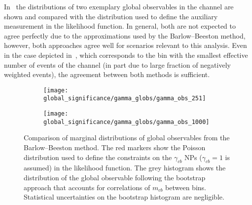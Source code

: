 In~ the distributions of two exemplary
global observables in the \hadhad channel are shown and compared with the
distribution used to define the auxiliary measurement in the likelihood
function. In general, both are not expected to agree perfectly due to the
approximations used by the Barlow--Beeston method, however, both approaches agree
well for scenarios relevant to this analysis. Even in the case depicted
in~, which corresponds to the
bin with the smallest effective number of events of the \hadhad channel (in part
due to large fraction of negatively weighted events), the agreement between both
methods is sufficient.

\begin{figure}[htbp]
  \centering

  \begin{subfigure}{0.485\textwidth}
    \centering

    \texttt{[image: global\_significance/gamma\_globs/gamma\_obs\_251]}
    \label{fig:comparison_bootstrap_poisson_lowest_tau}
  \end{subfigure}\hfill%
  \begin{subfigure}{0.485\textwidth}
    \centering

    \texttt{[image: global\_significance/gamma\_globs/gamma\_obs\_1000]}
  \end{subfigure}

  \caption[TODO]{Comparison of marginal distributions of global observables from
    the Barlow--Beeston method. The red markers show the Poisson distribution
    used to define the constraints on the $\gamma_{cb}$ NPs ($\gamma_{cb} = 1$
    is assumed) in the likelihood function. The grey histogram shows the
    distribution of the global observable following the bootstrap approach that
    accounts for correlations of $m_{cb}$ between bins. Statistical
    uncertainties on the bootstrap histogram are negligible.}
  \label{fig:comparison_bootstrap_poisson}
\end{figure}


